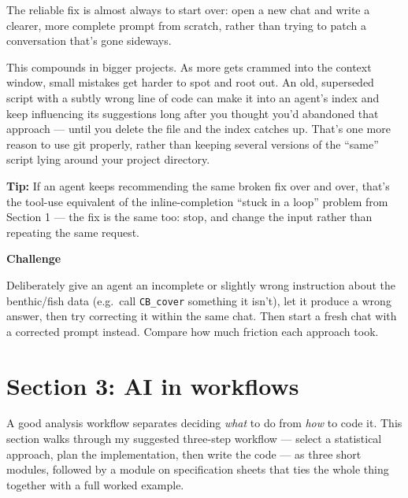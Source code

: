 \documentclass[
  letterpaper,
  DIV=11,
  numbers=noendperiod]{scrreprt}
\begin{document}
The reliable fix is almost always to start over: open a new chat and
write a clearer, more complete prompt from scratch, rather than trying
to patch a conversation that's gone sideways.

This compounds in bigger projects. As more gets crammed into the context
window, small mistakes get harder to spot and root out. An old,
superseded script with a subtly wrong line of code can make it into an
agent's index and keep influencing its suggestions long after you
thought you'd abandoned that approach --- until you delete the file and
the index catches up. That's one more reason to use git properly, rather
than keeping several versions of the ``same'' script lying around your
project directory.

\textbf{Tip:} If an agent keeps recommending the same broken fix over
and over, that's the tool-use equivalent of the inline-completion
``stuck in a loop'' problem from Section 1 --- the fix is the same too:
stop, and change the input rather than repeating the same request.

\begin{tcolorbox}[enhanced jigsaw, toprule=.15mm, rightrule=.15mm, left=2mm, leftrule=.75mm, breakable, opacityback=0, arc=.35mm, colframe=quarto-callout-important-color-frame, bottomrule=.15mm, colback=white]
\begin{minipage}[t]{5.5mm}
\textcolor{quarto-callout-important-color}{\faExclamation}
\end{minipage}%
\begin{minipage}[t]{\textwidth - 5.5mm}

\vspace{-3mm}\textbf{Challenge}\vspace{3mm}

Deliberately give an agent an incomplete or slightly wrong instruction
about the benthic/fish data (e.g.~call \texttt{CB\_cover} something it
isn't), let it produce a wrong answer, then try correcting it within the
same chat. Then start a fresh chat with a corrected prompt instead.
Compare how much friction each approach took.

\end{minipage}%
\end{tcolorbox}

\part{Section 3: AI in workflows}

A good analysis workflow separates deciding \emph{what} to do from
\emph{how} to code it. This section walks through my suggested
three-step workflow --- select a statistical approach, plan the
implementation, then write the code --- as three short modules, followed
by a module on specification sheets that ties the whole thing together
with a full worked example.
\end{document}
